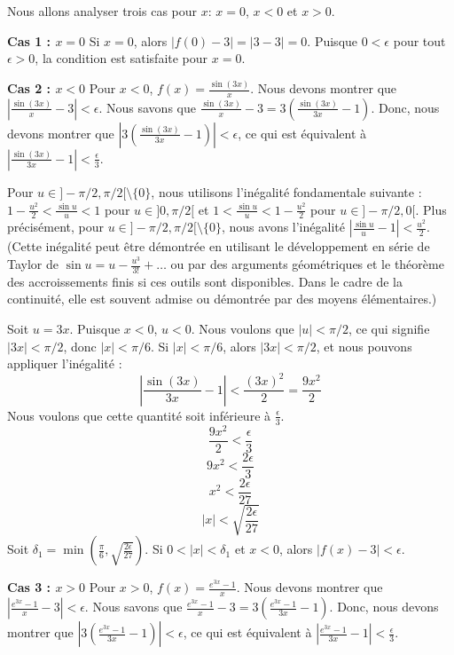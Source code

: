 \documentclass[12pt,a4paper]{report}
\begin{document}
Nous allons analyser trois cas pour $x$: $x=0$, $x<0$ et $x>0$.

\textbf{Cas 1 : $x = 0$}
Si $x=0$, alors $|f(0) - 3| = |3 - 3| = 0$. Puisque $0 < \epsilon$ pour tout $\epsilon > 0$, la condition est satisfaite pour $x=0$.

\textbf{Cas 2 : $x < 0$}
Pour $x < 0$, $f(x) = \frac{\sin(3x)}{x}$. Nous devons montrer que $|\frac{\sin(3x)}{x} - 3| < \epsilon$.
Nous savons que $\frac{\sin(3x)}{x} - 3 = 3 \left( \frac{\sin(3x)}{3x} - 1 \right)$.
Donc, nous devons montrer que $\left| 3 \left( \frac{\sin(3x)}{3x} - 1 \right) \right| < \epsilon$, ce qui est équivalent à $\left| \frac{\sin(3x)}{3x} - 1 \right| < \frac{\epsilon}{3}$.

Pour $u \in ]-\pi/2, \pi/2[ \setminus \{0\}$, nous utilisons l'inégalité fondamentale suivante :
$1 - \frac{u^2}{2} < \frac{\sin u}{u} < 1$ pour $u \in ]0, \pi/2[$ et $1 < \frac{\sin u}{u} < 1 - \frac{u^2}{2}$ pour $u \in ]-\pi/2, 0[$.
Plus précisément, pour $u \in ]-\pi/2, \pi/2[ \setminus \{0\}$, nous avons l'inégalité $|\frac{\sin u}{u} - 1| < \frac{u^2}{2}$.
(Cette inégalité peut être démontrée en utilisant le développement en série de Taylor de $\sin u = u - \frac{u^3}{3!} + \dots$ ou par des arguments géométriques et le théorème des accroissements finis si ces outils sont disponibles. Dans le cadre de la continuité, elle est souvent admise ou démontrée par des moyens élémentaires.)

Soit $u = 3x$. Puisque $x < 0$, $u < 0$.
Nous voulons que $|u| < \pi/2$, ce qui signifie $|3x| < \pi/2$, donc $|x| < \pi/6$.
Si $|x| < \pi/6$, alors $|3x| < \pi/2$, et nous pouvons appliquer l'inégalité :
$$ \left| \frac{\sin(3x)}{3x} - 1 \right| < \frac{(3x)^2}{2} = \frac{9x^2}{2} $$
Nous voulons que cette quantité soit inférieure à $\frac{\epsilon}{3}$.
$$ \frac{9x^2}{2} < \frac{\epsilon}{3} $$
$$ 9x^2 < \frac{2\epsilon}{3} $$
$$ x^2 < \frac{2\epsilon}{27} $$
$$ |x| < \sqrt{\frac{2\epsilon}{27}} $$
Soit $\delta_1 = \min\left(\frac{\pi}{6}, \sqrt{\frac{2\epsilon}{27}}\right)$. Si $0 < |x| < \delta_1$ et $x<0$, alors $|f(x) - 3| < \epsilon$.

\textbf{Cas 3 : $x > 0$}
Pour $x > 0$, $f(x) = \frac{e^{3x} - 1}{x}$. Nous devons montrer que $|\frac{e^{3x} - 1}{x} - 3| < \epsilon$.
Nous savons que $\frac{e^{3x} - 1}{x} - 3 = 3 \left( \frac{e^{3x} - 1}{3x} - 1 \right)$.
Donc, nous devons montrer que $\left| 3 \left( \frac{e^{3x} - 1}{3x} - 1 \right) \right| < \epsilon$, ce qui est équivalent à $\left| \frac{e^{3x} - 1}{3x} - 1 \right| < \frac{\epsilon}{3}$.
\end{document}
